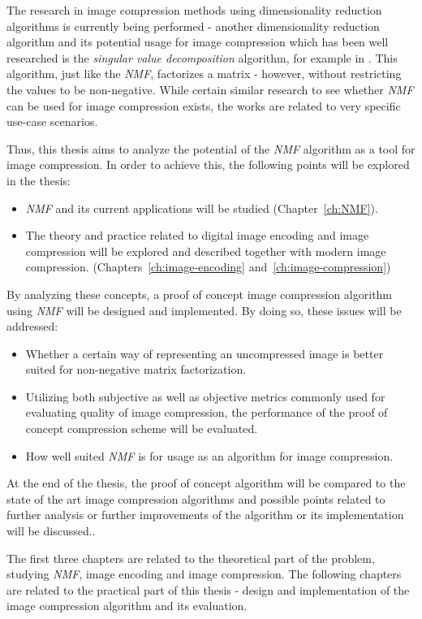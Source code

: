 \documentclass[thesis=M,english]{FITthesis}[2012/10/20]
\begin{document}
The research in image compression methods using dimensionality reduction algorithms is currently being
performed - another dimensionality reduction algorithm and its potential usage for image compression 
which has been well researched is the \emph{singular value decomposition} algorithm, for example
in \cite{svd-compression}. This algorithm, just like the \emph{NMF}, factorizes a matrix - however, without
restricting the values to be non-negative. While certain similar research to see whether
\emph{NMF} can be used for image compression exists, the works are related to very
specific use-case scenarios.

Thus, this thesis aims to analyze the potential of the \emph{NMF} algorithm
as a tool for image compression. In order to achieve this, the following points
will be explored in the thesis:
\begin{itemize}[topsep=0pt]
  \item \emph{NMF} and its current applications will be studied (Chapter~\ref{ch:NMF}).
  \item The theory and practice related to digital image encoding and image
        compression will be explored and described together with
        modern image compression. (Chapters~\ref{ch:image-encoding} and~\ref{ch:image-compression})
\end{itemize}

By analyzing these concepts, a proof of concept image compression algorithm using
\emph{NMF} will be designed and implemented. By doing so, these issues will be
addressed:
\begin{itemize}[topsep=0pt]
  \item Whether a certain way of representing an uncompressed image is better
        suited for non-negative matrix factorization.
  \item Utilizing both subjective as well as objective metrics commonly used
        for evaluating quality of image compression, the performance of
        the proof of concept compression scheme will be evaluated.
  \item How well suited \emph{NMF} is for usage as an algorithm for image
        compression.
\end{itemize} 
At the end of the thesis, the proof of concept algorithm will be compared to
the state of the art image compression algorithms and possible points related
to further analysis or further improvements of the algorithm or its implementation
will be discussed..

The first three chapters are related to the theoretical part of the problem, studying
\emph{NMF}, image encoding and image compression. The following chapters are related
to the practical part of this thesis - design and implementation of the image
compression algorithm and its evaluation.
\end{document}
